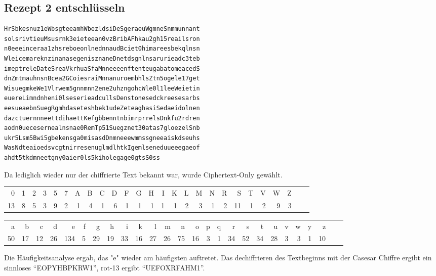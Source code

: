 \subsection{Rezept 2 entschlüsseln}
\label{RezeptZweiEntschluesseln}

\begin{lstlisting}[caption={Das verschlüsselte 2. Rezept: Rezept2NR.txt},
 linewidth=\textwidth,
 breaklines, breakatwhitespace=false]
HrSbkesnuz1eWbsgteeamhWbezldsiDeSgeraeuWgmneSnmmunnant
solsrivtieuMsusrnk3eieteean0vzBribAFhkau2gh15reailsron
n0eeeinceraa1zhsreboeonlnednnaudBciet0himareesbekqlnsn
WleicemareknzinanasegenisznaneDnetdsgnlnsarurieadc3teb
imeptreleDateSreaVkrhuaSfaMnneeeenftenteugabatomeacedS
dnZmtmauhnsnBcea2GCoiesraiMnnanuroembhlsZtn5ogele17get
WisuegmkeWe1Vlrwem5gnnmnn2ene2uhzngohcWle0l1leeWeietin
euereLimndnheni0lseserieadcullsDenstonesedckreesesarbs
eesueaebnSuegRgmhdaseteshbek1udeZeteaghasiSedaeidolnen
dazctuernnneettdihaettKefgbbenntnbimrprrelsDnkfu2rdren
aodn0uecesernealnsnae0RemTp51Suegznet30atas7gloezelSnb
ukr5Lsm5Bwi5gbekensga0misasdDnmneeewmmssgneeaiskdseuhs
WasNdteaioedsvcgtnirresenuglmdlhtkIgemlseneduueeegaeof
ahdt5tkdmneetgny0aier0ls5kiholegage0gtsS0ss
\end{lstlisting}

Da lediglich wieder nur der chiffrierte Text bekannt war, wurde Ciphertext-Only
gewählt.

\begin{table}\footnotesize
\begin{tabular}{*{26}{@{\hspace{1ex}}r}}
 0 & 1 & 2 & 3 & 5 & 7 & A & B & C & D & F & G & H & I & K & L & M & N & R & S & T & V & W & Z \\
 13 & 8 & 5 & 3 & 9 & 2 & 1 & 4 & 1 & 6 & 1 & 1 & 1 & 1 & 1 & 2 & 3 & 1 & 2 & 11 & 1 & 2 & 9 & 3 \\
\end{tabular}

\begin{tabular}{*{26}{@{\hspace{1ex}}r}}
 a & b & c & d & e & f & g & h & i & k & l & m & n & o & p & q & r & s & t & u & v & w & y & z \\
 50 & 17 & 12 & 26 & 134 & 5 & 29 & 19 & 33 & 16 & 27 & 26 & 75 & 16 & 3 & 1 & 34 & 52 & 34 & 28 & 3 & 3 & 1 & 10 \\
\end{tabular}
\end{table}

Die Häufigkeitsanalyse ergab, das "e" wieder am häufigsten auftretet. Das
dechiffrieren des Textbeginns mit der Casesar Chiffre ergibt ein sinnloses
``EOPYHBPKRW1'', rot-13 ergibt ``UEFOXRFAHM1''.

